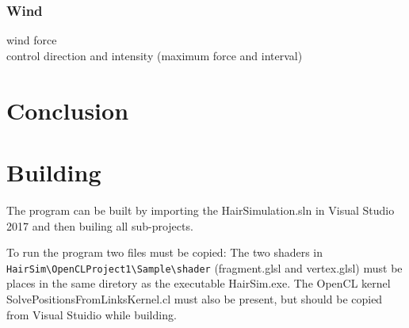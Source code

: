 \documentclass[11pt,a4paper]{scrartcl}
\begin{document}
\newpage
\subsubsection{Wind}
wind force \\ control direction and intensity (maximum force and interval)


\section{Conclusion}


\newpage
\section{Building}
The program can be built by importing the HairSimulation.sln in Visual Studio 2017 and then builing all sub-projects.

To run the program two files must be copied: The two shaders in \verb|HairSim\OpenCLProject1\Sample\shader| (fragment.glsl and vertex.glsl) must be places in the same diretory as the executable HairSim.exe. The OpenCL kernel SolvePositionsFromLinksKernel.cl must also be present, but should be copied from Visual Stuidio while building.
\end{document}

